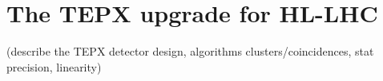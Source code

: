 \section{The TEPX upgrade for HL-LHC}
\label{sec:tepx}
(describe the TEPX detector design, algorithms clusters/coincidences, stat precision, linearity)
